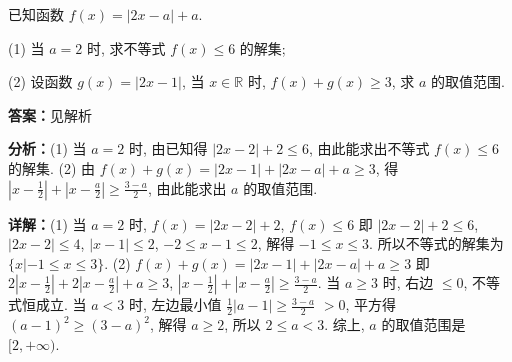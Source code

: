 \begin{question}[points=10]
已知函数 $f(x)=|2x-a|+a$.

(1) 当 $a=2$ 时, 求不等式 $f(x)\le 6$ 的解集;

(2) 设函数 $g(x)=|2x-1|$, 当 $x\in\mathbb{R}$ 时, $f(x)+g(x)\ge 3$, 求 $a$ 的取值范围.
\begin{solution}
\textbf{答案：}见解析

\textbf{分析：}(1) 当 $a=2$ 时, 由已知得 $|2x-2|+2\le 6$, 由此能求出不等式 $f(x)\le 6$ 的解集.
(2) 由 $f(x)+g(x)=|2x-1|+|2x-a|+a\ge 3$, 得 $|x-\frac{1}{2}|+|x-\frac{a}{2}|\ge \frac{3-a}{2}$, 由此能求出 $a$ 的取值范围.

\textbf{详解：}(1) 当 $a=2$ 时, $f(x)=|2x-2|+2$, $f(x)\le 6$ 即 $|2x-2|+2\le 6$, $|2x-2|\le 4$, $|x-1|\le 2$, $-2\le x-1\le 2$, 解得 $-1\le x\le 3$. 所以不等式的解集为 $\{x|-1\le x\le 3\}$.
(2) $f(x)+g(x)=|2x-1|+|2x-a|+a\ge 3$ 即 $2|x-\frac{1}{2}|+2|x-\frac{a}{2}|+a\ge 3$, $|x-\frac{1}{2}|+|x-\frac{a}{2}|\ge \frac{3-a}{2}$. 当 $a\ge 3$ 时, 右边 $\le 0$, 不等式恒成立. 当 $a<3$ 时, 左边最小值 $\frac{1}{2}|a-1|\ge \frac{3-a}{2}$ $>0$, 平方得 $(a-1)^2\ge (3-a)^2$, 解得 $a\ge 2$, 所以 $2\le a<3$. 综上, $a$ 的取值范围是 $[2,+\infty)$.
\end{solution}
\end{question}


